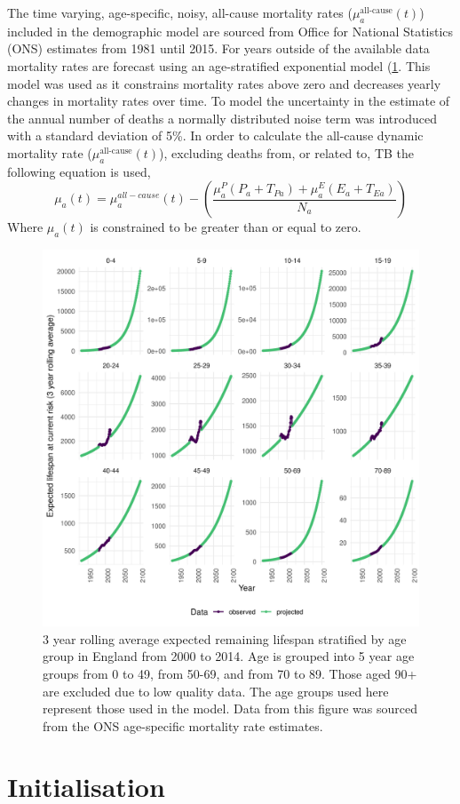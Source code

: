 \documentclass[11pt,twoside]{bristolthesis}
\begin{document}
  The time varying, age-specific, noisy, all-cause mortality rates (\(\mu^{\text{all-cause}}_a(t)\)) included in the demographic model are sourced from Office for National Statistics (ONS) estimates from 1981 until 2015. For years outside of the available data mortality rates are forecast using an age-stratified exponential model (\ref{fig:mortality-england}. This model was used as it constrains mortality rates above zero and decreases yearly changes in mortality rates over time. To model the uncertainty in the estimate of the annual number of deaths a normally distributed noise term was introduced with a standard deviation of 5\%. In order to calculate the all-cause dynamic mortality rate (\(\mu^{\text{all-cause}}_a(t)\)), excluding deaths from, or related to, TB the following equation is used,
  \begin{equation}
  \mu_a(t) = \mu^{all-cause}_a(t) - \left(\frac{\mu^P_a(P_a + T_{Pa}) + \mu^E_a(E_a + T_{Ea})}{N_a}\right)
    \label{eq:adjusted-mortality}
  \end{equation}
  Where \(\mu_a(t)\) is constrained to be greater than or equal to zero.
  \begin{figure}
  
  {\centering \includegraphics[width=0.8\linewidth,]{chapters/model-development/resources/figure/mortality} 
  
  }
  
  \caption[3 year rolling average expected remaining lifespan stratified by age group in England from 2000 to 2014.]{3 year rolling average expected remaining lifespan stratified by age group in England from 2000 to 2014. Age is grouped into 5 year age groups from 0 to 49, from 50-69, and from 70 to 89. Those aged 90+ are excluded due to low quality data. The age groups used here represent those used in the model. Data from this figure was sourced from the ONS age-specific mortality rate estimates.}\label{fig:mortality-england}
  \end{figure}
  \hypertarget{initialisation}{%
  \section{Initialisation}\label{initialisation}}
  
\end{document}
